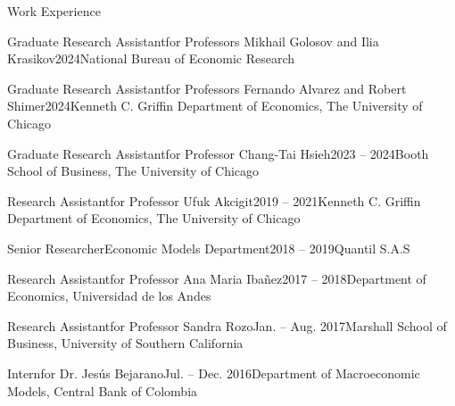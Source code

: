 \documentclass[]{kyvernitis-resume}
\begin{document}
\begin{section}{Work Experience}
    \begin{subsectionnobullet}{Graduate Research Assistant}{\small{for Professors Mikhail Golosov and Ilia Krasikov}}{2024}{\footnotesize{National Bureau of Economic Research}}
    \end{subsectionnobullet}
    \begin{subsectionnobullet}{Graduate Research Assistant}{\small{for Professors Fernando Alvarez and Robert Shimer}}{2024}{\footnotesize{Kenneth C. Griffin Department of Economics, The University of Chicago}}
    \end{subsectionnobullet}
    \begin{subsectionnobullet}{Graduate Research Assistant}{\small{for Professor Chang-Tai Hsieh}}{2023 -- 2024}{\footnotesize{Booth School of Business, The University of Chicago}}
    \end{subsectionnobullet}
    \begin{subsectionnobullet}{Research Assistant}{\small{for Professor Ufuk Akcigit}}{2019 -- 2021}{\footnotesize{Kenneth C. Griffin Department of Economics, The University of Chicago}}
    \end{subsectionnobullet}
    \begin{subsectionnobullet}{Senior Researcher}{\small{Economic Models Department}}{2018 -- 2019}{\footnotesize{Quantil S.A.S}}
    \end{subsectionnobullet}
    \begin{subsectionnobullet}{Research Assistant}{\small{for Professor Ana Maria Ibañez}}{2017 -- 2018}{\footnotesize{Department of Economics, Universidad de los Andes}}
    \end{subsectionnobullet}
    \begin{subsectionnobullet}{Research Assistant}{\small{for Professor Sandra Rozo}}{Jan. -- Aug. 2017}{\footnotesize{Marshall School of Business, University of Southern California}}
    \end{subsectionnobullet}
    \begin{subsectionnobullet}{Intern}{\small{for Dr. Jesús Bejarano}}{Jul. -- Dec. 2016}{\footnotesize{Department of Macroeconomic Models, Central Bank of Colombia}}
    \end{subsectionnobullet}

\end{section}

\pagebreak
\end{document}
